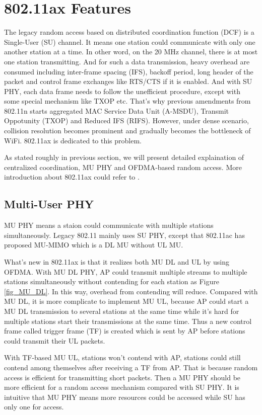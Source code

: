 \chapter{802.11ax Features}			\label{chp_ax_feature}
The legacy random access based on distributed coordination function (DCF) is a Single-User (SU) channel. 
It means one station could communicate with only one another station at a time. 
In other word, on the 20 MHz channel, there is at most one station transmitting. And for such a data transmission, heavy overhead are consumed including inter-frame spacing (IFS), backoff period, long header of the packet and control frame exchanges like RTS/CTS if it is enabled. 
And with SU PHY, each data frame needs to follow the unefficient procedure, except with some special mechanism like TXOP etc.
That's why previous amendments from 802.11n starts aggregated MAC Service Data Unit (A-MSDU), Transmit Oppotunity (TXOP) and Reduced IFS (RIFS).
However, under dense scenario, collision resolution becomes prominent and gradually becomes the bottleneck of WiFi.
802.11ax is dedicated to this problem.

As stated roughly in previous section, we will present detailed explaination of centralized coordination, MU PHY and OFDMA-based random access.
More introduction about 802.11ax could refer to \cite{bellalta2016ieee}\cite{deng2014ieee}\cite{dengquality}. 

\section{Multi-User PHY} \label{sec_MU}
MU PHY means a staion could communicate with multiple stations simultaneously. %
Legacy 802.11 mainly uses SU PHY, except that 802.11ac has proposed MU-MIMO which is a DL MU without UL MU.

What's new in 802.11ax is that it realizes both MU DL and UL by using OFDMA. 
With MU DL PHY, AP could transmit multiple streams to multiple stations simultaneously without contending for each station as Figure \ref{fig_MU_DL}. 
In this way, overhead from contending will reduce. 
Compared with MU DL, it is more complicate to implement MU UL, because AP could start a MU DL transmission to several stations at the same time while it's hard for multiple stations start their transmissions at the same time.
Thus a new control frame called trigger frame (TF) is created which is sent by AP before stations could transmit their UL packets. 

With TF-based MU UL, stations won't contend with AP, stations could still contend among themselves after receiving a TF from AP.
That is because random access is efficient for transmitting short packets\cite{bertsekas1992data}.
Then a MU PHY should be more efficient for a random access mechanism compared with SU PHY.
It is intuitive that MU PHY means more resources could be accessed while SU has only one for access.

